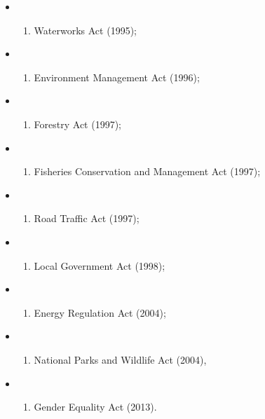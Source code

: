 \documentclass[
]{book}
\providecommand{\tightlist}{%
  \setlength{\itemsep}{0pt}\setlength{\parskip}{0pt}}
\begin{document}
\begin{itemize}
\begin{enumerate}
  \end{enumerate}
\item
  \begin{enumerate}
  \def\labelenumi{\roman{enumi}.}
  \setcounter{enumi}{23}
  \tightlist
  \item
    Waterworks Act (1995);
  \end{enumerate}
\item
  \begin{enumerate}
  \def\labelenumi{\roman{enumi}.}
  \setcounter{enumi}{24}
  \tightlist
  \item
    Environment Management Act (1996);
  \end{enumerate}
\item
  \begin{enumerate}
  \def\labelenumi{\roman{enumi}.}
  \setcounter{enumi}{25}
  \tightlist
  \item
    Forestry Act (1997);
  \end{enumerate}
\item
  \begin{enumerate}
  \def\labelenumi{\roman{enumi}.}
  \setcounter{enumi}{26}
  \tightlist
  \item
    Fisheries Conservation and Management Act (1997);
  \end{enumerate}
\item
  \begin{enumerate}
  \def\labelenumi{\roman{enumi}.}
  \setcounter{enumi}{27}
  \tightlist
  \item
    Road Traffic Act (1997);
  \end{enumerate}
\item
  \begin{enumerate}
  \def\labelenumi{\roman{enumi}.}
  \setcounter{enumi}{28}
  \tightlist
  \item
    Local Government Act (1998);
  \end{enumerate}
\item
  \begin{enumerate}
  \def\labelenumi{\roman{enumi}.}
  \setcounter{enumi}{29}
  \tightlist
  \item
    Energy Regulation Act (2004);
  \end{enumerate}
\item
  \begin{enumerate}
  \def\labelenumi{\roman{enumi}.}
  \setcounter{enumi}{30}
  \tightlist
  \item
    National Parks and Wildlife Act (2004),
  \end{enumerate}
\item
  \begin{enumerate}
  \def\labelenumi{\roman{enumi}.}
  \setcounter{enumi}{31}
  \tightlist
  \item
    Gender Equality Act (2013).
  \end{enumerate}
\end{itemize}
\end{document}
